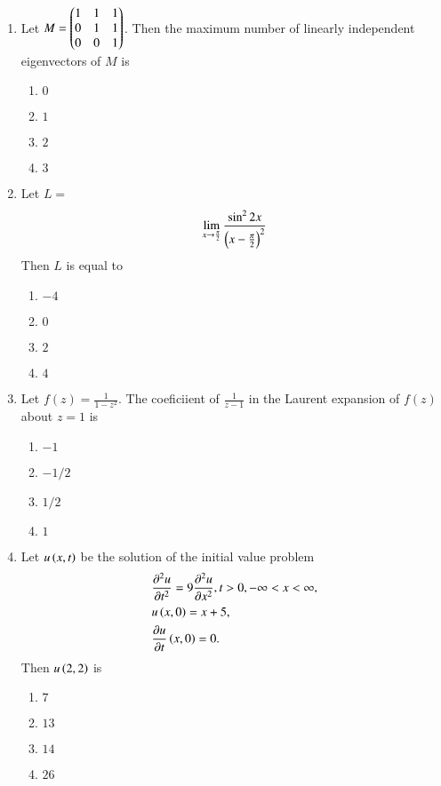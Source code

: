 \documentclass[journal]{IEEEtran}
\begin{document}
\begin{enumerate}
    \item Let $M = \begin{pmatrix}1&1&1\\0&1&1\\0&0&1\end{pmatrix}$. Then the maximum number of linearly independent eigenvectors of $M$ is
        \begin{enumerate}
            \item $0$
            \item $1$
            \item $2$
            \item $3$
        \end{enumerate}

    \item Let $L =$ $$\lim_{x \to \frac{\pi}{2}} \frac{\sin ^ 2 2x}{\left(x - \frac{\pi}{2}\right)^2}$$ Then $L$ is equal to
        \begin{enumerate}
            \item $-4$
            \item $0$
            \item $2$
            \item $4$
        \end{enumerate}

    \item Let $f(z) = \frac{1}{1-z^2}$. The coeficiient of $\frac{1}{z-1}$ in the Laurent expansion of $f(z)$ about $z=1$ is
        \begin{enumerate}
            \item $-1$
            \item $-1/2$
            \item $1/2$
            \item $1$
        \end{enumerate}

    \item Let $u\left(x,t\right)$ be the solution of the initial value problem 
    \begin{align*}
        &\frac{\partial ^ 2 u}{\partial t^2} = 9 \frac{\partial ^ 2 u}{\partial x^2}, t>0, - \infty < x< \infty,\\
        &u\left(x,0\right) = x+5,\\
        &\frac{\partial u}{\partial t}\left(x,0\right) = 0.
    \end{align*}
    Then $u\left(2,2\right)$ is 
        \begin{enumerate}
            \item $7$
            \item $13$
            \item $14$
            \item $26$
        \end{enumerate}


\end{enumerate}
\end{document}
